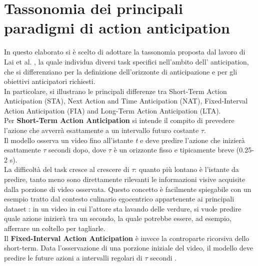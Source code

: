 \section{Tassonomia dei principali paradigmi di action anticipation}
In questo elaborato si è scelto di adottare la tassonomia proposta dal lavoro di Lai et al. \cite{lai2024human}, la quale individua diversi task specifici nell'ambito dell'
anticipation, che si differenziano per la definizione dell'orizzonte di anticipazione e per gli obiettivi anticipatori richiesti.\\
In particolare, si illustrano le principali differenze tra Short-Term Action Anticipation (STA), Next Action and Time Anticipation (NAT), Fixed-Interval Action Anticipation (FIA) and Long-Term Action Anticipation (LTA). \\
Per \textbf{Short-Term Action Anticipation} si intende il compito di prevedere l'azione che avverrà esattamente a un intervallo futuro costante $\tau$.\\
Il modello osserva un video fino all'istante \textit{t} e deve predire l'azione che inizierà esattamente $\tau$ secondi dopo, dove $\tau$ è un orizzonte fisso e tipicamente breve (0.25-2 s). \\
La difficoltà del task cresce al crescere di $\tau$: quanto più lontano è l'istante da predire, tanto meno sono direttamente rilevanti le informazioni visive acquisite dalla porzione di video osservata. Questo concetto è facilmente spiegabile con un esempio tratto dal contesto culinario egocentrico appartenente ai principali dataset \cite{damen2018scaling}: in un video in cui l'attore sta lavando delle verdure, si vuole predire quale azione inizierà tra un secondo, la quale potrebbe essere, ad esempio, afferrare un coltello per tagliarle. \\
Il \textbf{Fixed-Interval Action Anticipation} è invece la controparte ricorsiva dello short-term. Data l'osservazione di una porzione iniziale del video, il modello deve predire le future azioni a intervalli regolari di $\tau$ secondi \cite{lai2024human}.
